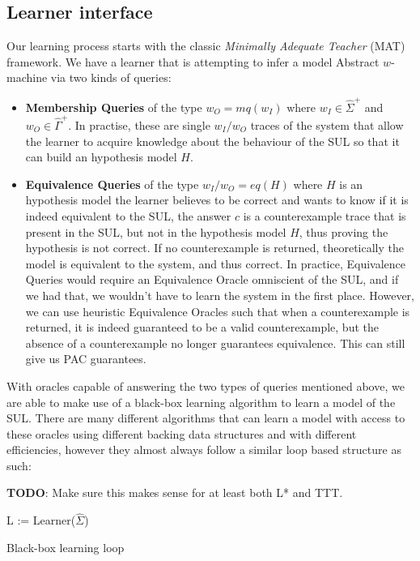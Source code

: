 \documentclass{article}
\begin{document}
\subsection{Learner interface}
Our learning process starts with the classic \emph{Minimally Adequate Teacher} (MAT) framework. We have a learner that is attempting to infer a model Abstract $w$-machine via two kinds of queries:
\begin{itemize}
    \item \textbf{Membership Queries} of the type $w_O = mq(w_I)$ where $w_I \in \hat\Sigma^+$ and $w_O \in \hat\Gamma^+$. In practise, these are single $w_I / w_O$ traces of the system that allow the learner to acquire knowledge about the behaviour of the SUL so that it can build an hypothesis model $H$.
    \item \textbf{Equivalence Queries} of the type $w_I / w_O = eq(H)$ where $H$ is an hypothesis model the learner believes to be correct and wants to know if it is indeed equivalent to the SUL, the answer $c$ is a counterexample trace that is present in the SUL, but not in the hypothesis model $H$, thus proving the hypothesis is not correct. If no counterexample is returned, theoretically the model is equivalent to the system, and thus correct. In practice, Equivalence Queries would require an Equivalence Oracle omniscient of the SUL, and if we had that, we wouldn't have to learn the system in the first place. However, we can use heuristic Equivalence Oracles such that when a counterexample is returned, it is indeed guaranteed to be a valid counterexample, but the absence of a counterexample no longer guarantees equivalence. This can still give us PAC guarantees.
\end{itemize}

With oracles capable of answering the two types of queries mentioned above, we are able to make use of a black-box learning algorithm to learn a model of the SUL. There are many different algorithms that can learn a model with access to these oracles using different backing data structures and with different efficiencies, however they almost always follow a similar loop based structure as such:

\textbf{TODO}: Make sure this makes sense for at least both L* and TTT.

\begin{algorithm}[H]
L := Learner($\hat\Sigma$)\;
\caption{Black-box learning loop}
\end{algorithm}
\end{document}
